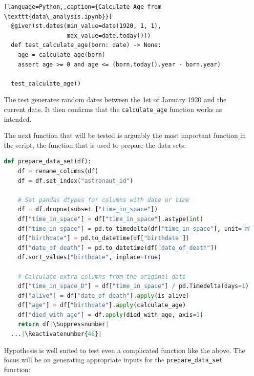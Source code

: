 \documentclass[runningheads]{llncs}
\makeatletter
\let\origthelstnumber\thelstnumber
\newcommand*\Suppressnumber{%
  \lst@AddToHook{OnNewLine}{%
    \let\thelstnumber\relax%
     \advance\c@lstnumber-\@ne\relax%
    }%
}
\newcommand*\Reactivatenumber[1]{%
  \setcounter{lstnumber}{\numexpr#1-1\relax}
  \lst@AddToHook{OnNewLine}{%
   \let\thelstnumber\origthelstnumber%
   \refstepcounter{lstnumber}%
  }%
}
\makeatother
\begin{document}
\begin{lstlisting}[language=Python,,caption={Calculate Age from \texttt{data\_analysis.ipynb}}]
  @given(st.dates(min_value=date(1920, 1, 1), 
                  max_value=date.today()))
  def test_calculate_age(born: date) -> None:
    age = calculate_age(born)
    assert age >= 0 and age <= (born.today().year - born.year)
  
  test_calculate_age()
\end{lstlisting}
The test generates random dates between the 1st of January 1920 and the current date. It then confirms that the \texttt{calculate\_age} function works as intended.

\vspace{5mm}
\noindent The next function that will be tested is arguably the most important function in the script, the function that is used to prepare the data sets:

\begin{lstlisting}[language=Python,caption={Prepare Data Set from \texttt{data\_analysis.ipynb}}]
  def prepare_data_set(df):
    df = rename_columns(df)
    df = df.set_index("astronaut_id")

    # Set pandas dtypes for columns with date or time
    df = df.dropna(subset=["time_in_space"])
    df["time_in_space"] = df["time_in_space"].astype(int)
    df["time_in_space"] = pd.to_timedelta(df["time_in_space"], unit="m")
    df["birthdate"] = pd.to_datetime(df["birthdate"])
    df["date_of_death"] = pd.to_datetime(df["date_of_death"])
    df.sort_values("birthdate", inplace=True)

    # Calculate extra columns from the original data
    df["time_in_space_D"] = df["time_in_space"] / pd.Timedelta(days=1)
    df["alive"] = df["date_of_death"].apply(is_alive)
    df["age"] = df["birthdate"].apply(calculate_age)
    df["died_with_age"] = df.apply(died_with_age, axis=1)
    return df|\Suppressnumber|
  ...|\Reactivatenumber{46}|

\end{lstlisting}
Hypothesis is well suited to test even a complicated function like the above. The focus will be on generating appropriate inputs for the \texttt{prepare\_data\_set} function:
\end{document}
